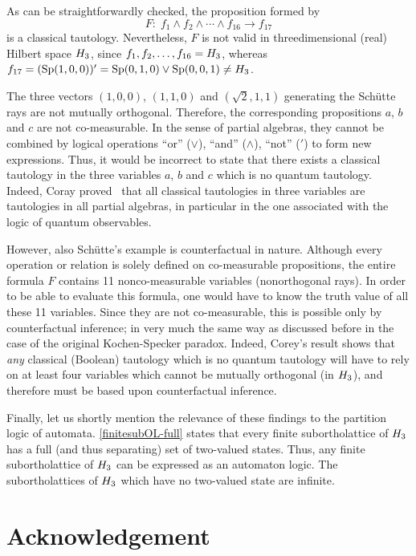 As can be straightforwardly checked, the proposition formed by
  $$
  F\colon\; f_1 \wedge f_2 \wedge  \cdots \wedge f_{16}\rightarrow f_{17}
  $$
is a classical tautology. Nevertheless, $F$ is not valid in threedimensional
(real) Hilbert space $H_3$, since $f_1,f_2, \ldots, f_{16}=H_3$, whereas
$f_{17}= ( {\rm Sp} (1,0,0))'={\rm Sp} (0,1,0)\vee {\rm Sp} (0,0,1) \neq H_3$.


The three vectors $(1,0,0)$, $(1,1,0)$ and $(\sqrt{2},1,1)$ generating the
Sch\"utte rays are not mutually orthogonal. Therefore, the corresponding
propositions $a$, $b$ and $c$ are not co-measurable. In the sense of partial
algebras, they cannot be combined by logical operations ``or'' ($\vee$),
``and'' ($\land$), ``not'' ($'$) to form new expressions. Thus, it would be
incorrect to state that there exists a classical tautology in the three
variables $a$, $b$ and $c$ which is no quantum tautology. Indeed, Coray
proved~\cite{coray} that all classical tautologies in three variables are
tautologies in all partial algebras, in particular in the one associated
with the logic of quantum observables.

However, also Sch\"utte's example is counterfactual in nature.
Although every  operation or relation is solely defined on
co-measurable propositions, the entire formula $F$ contains 11
nonco-measurable variables (nonorthogonal rays). In order to be able to
evaluate this formula, one would have to know the truth value of all
these 11 variables. Since they are not co-measurable, this is possible
only by counterfactual inference; in very much the same way as discussed
before in the case of the original Kochen-Specker paradox.
Indeed, Corey's result shows that {\em any\/} classical (Boolean)
tautology which is no quantum tautology will have to rely on at least
four variables which cannot be mutually orthogonal (in $H_3$), and
therefore must be based upon counterfactual inference.

Finally, let us shortly mention the relevance of these findings to
the partition logic of automata. \ref{finitesubOL-full} states that
every finite subortholattice of $H_3$ has a full (and thus separating)
set of two-valued states.  Thus, any finite subortholattice of $H_3$ can
be expressed as an automaton logic.  The subortholattices of $H_3$ which
have no two-valued state are infinite.




\section *{Acknowledgement}


